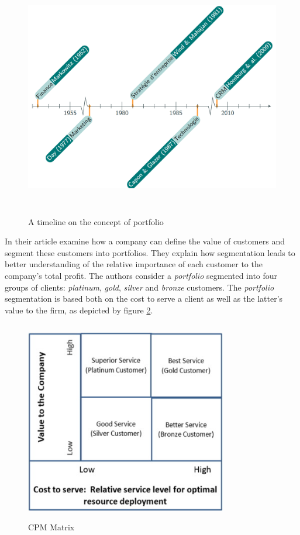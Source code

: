 \documentclass[
]{book}
\begin{document}
\begin{figure}

{\centering \includegraphics[width=400pt,height=300pt]{./imgs/portfolio_timeline} 

}

\caption{A timeline on the concept of portfolio}\label{fig:timeline}
\end{figure}

In their article \citet{CPM_CRM} examine how a company can define the
value of customers and segment these customers into portfolios. They explain how segmentation leads to better understanding of the relative importance of each customer to the company's total profit. The authors consider a \emph{portfolio} segmented into four groups of clients: \emph{platinum}, \emph{gold}, \emph{silver} and \emph{bronze} customers. The \emph{portfolio} segmentation is based both on the cost to serve a client as well as the latter's value to the firm, as depicted by figure \ref{fig:cpmmat}.

\begin{figure}

{\centering \includegraphics[width=250pt,height=250pt]{./imgs/cpm_matrix} 

}

\caption{CPM Matrix}\label{fig:cpmmat}
\end{figure}
\end{document}
